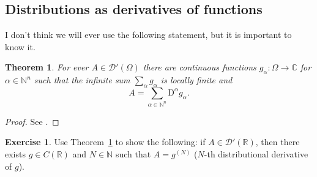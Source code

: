 \documentclass[a4paper,9pt]{amsart}
\newcommand{\scr}[1]{\mathscr{#1}}
\newcommand{\N}{\mathbb{N}}	%
\newcommand{\R}{\mathbb{R}}	%
\newcommand{\C}{\mathbb{C}}	%
\newcommand{\Diff}{\mathrm{D}}
\theoremstyle{plain}
\newtheorem{theorem}[proposition]{Theorem}
\theoremstyle{definition}
\newtheorem{exercise}[proposition]{Exercise}%
\theoremstyle{remark}
\begin{document}

\subsection{Distributions as derivatives of functions}\label{subs67e2746f}

I don't think we will ever use the following statement, but it is important to know it.

\begin{theorem}\label{thm67eaad41}
	For ever $A\in\scr D'(\Omega)$ there are continuous functions $g_\alpha:\Omega\to\C$ for $\alpha\in\N^n$ such that the infinite sum $\sum_\alpha g_\alpha$ is locally finite and
	\begin{equation}
		A = \sum_{\alpha\in\N^n} \Diff^\alpha g_\alpha .
	\end{equation}
\end{theorem}
\begin{proof}
	See \cite[Thm.6.28]{MR1157815}.
\end{proof}

\begin{exercise}\label{ex67eaae04}
	Use Theorem~\ref{thm67eaad41} to show the following:
	if $A\in\scr D'(\R)$, then there exists $g\in C(\R)$ and $N\in\N$ such that $A = g^{(N)}$ ($N$-th distributional derivative of $g$).
\end{exercise}
\end{document}
